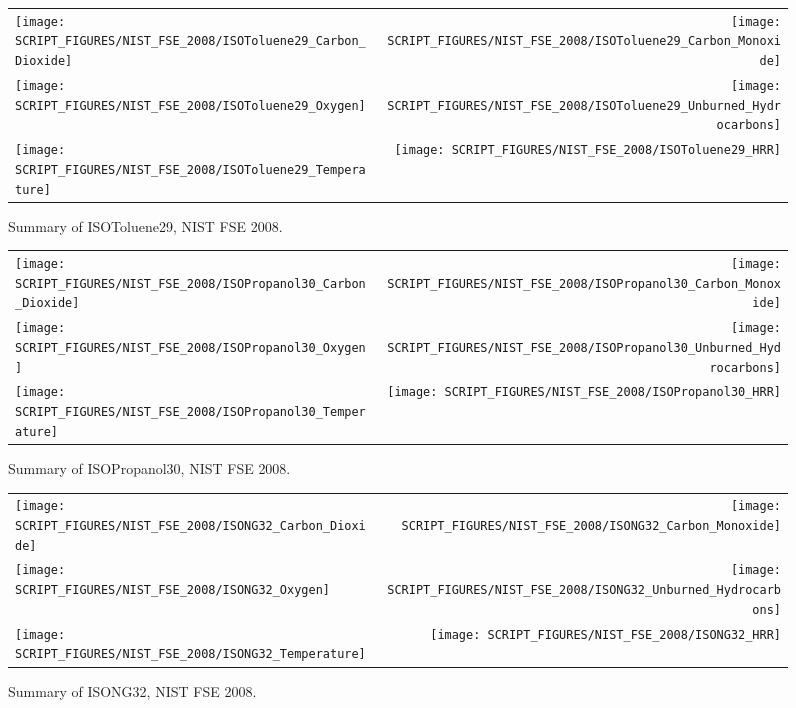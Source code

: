 \begin{figure}[p]
\begin{tabular*}{\textwidth}{l@{\extracolsep{\fill}}r}
\texttt{[image: SCRIPT\_FIGURES/NIST\_FSE\_2008/ISOToluene29\_Carbon\_Dioxide]} &
\texttt{[image: SCRIPT\_FIGURES/NIST\_FSE\_2008/ISOToluene29\_Carbon\_Monoxide]} \\
\texttt{[image: SCRIPT\_FIGURES/NIST\_FSE\_2008/ISOToluene29\_Oxygen]} &
\texttt{[image: SCRIPT\_FIGURES/NIST\_FSE\_2008/ISOToluene29\_Unburned\_Hydrocarbons]} \\
\texttt{[image: SCRIPT\_FIGURES/NIST\_FSE\_2008/ISOToluene29\_Temperature]} &
\texttt{[image: SCRIPT\_FIGURES/NIST\_FSE\_2008/ISOToluene29\_HRR]}
\end{tabular*}
\caption[Summary of ISOToluene29, NIST FSE 2008]{Summary of ISOToluene29, NIST FSE 2008.}
\label{NIST_FSE_1994_ISOToluene29}
\end{figure}

\begin{figure}[p]
\begin{tabular*}{\textwidth}{l@{\extracolsep{\fill}}r}
\texttt{[image: SCRIPT\_FIGURES/NIST\_FSE\_2008/ISOPropanol30\_Carbon\_Dioxide]} &
\texttt{[image: SCRIPT\_FIGURES/NIST\_FSE\_2008/ISOPropanol30\_Carbon\_Monoxide]} \\
\texttt{[image: SCRIPT\_FIGURES/NIST\_FSE\_2008/ISOPropanol30\_Oxygen]} &
\texttt{[image: SCRIPT\_FIGURES/NIST\_FSE\_2008/ISOPropanol30\_Unburned\_Hydrocarbons]} \\
\texttt{[image: SCRIPT\_FIGURES/NIST\_FSE\_2008/ISOPropanol30\_Temperature]} &
\texttt{[image: SCRIPT\_FIGURES/NIST\_FSE\_2008/ISOPropanol30\_HRR]}
\end{tabular*}
\caption[Summary of ISOPropanol30, NIST FSE 2008]{Summary of ISOPropanol30, NIST FSE 2008.}
\label{NIST_FSE_1994_ISOPropanol30}
\end{figure}

\begin{figure}[p]
\begin{tabular*}{\textwidth}{l@{\extracolsep{\fill}}r}
\texttt{[image: SCRIPT\_FIGURES/NIST\_FSE\_2008/ISONG32\_Carbon\_Dioxide]} &
\texttt{[image: SCRIPT\_FIGURES/NIST\_FSE\_2008/ISONG32\_Carbon\_Monoxide]} \\
\texttt{[image: SCRIPT\_FIGURES/NIST\_FSE\_2008/ISONG32\_Oxygen]} &
\texttt{[image: SCRIPT\_FIGURES/NIST\_FSE\_2008/ISONG32\_Unburned\_Hydrocarbons]} \\
\texttt{[image: SCRIPT\_FIGURES/NIST\_FSE\_2008/ISONG32\_Temperature]} &
\texttt{[image: SCRIPT\_FIGURES/NIST\_FSE\_2008/ISONG32\_HRR]}
\end{tabular*}
\caption[Summary of ISONG32, NIST FSE 2008]{Summary of ISONG32, NIST FSE 2008.}
\label{NIST_FSE_1994_ISONG32}
\end{figure}


